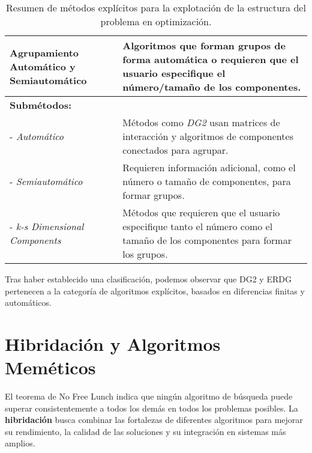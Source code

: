 \begin{table}[H]
{\begin{tabular}{|l|p{12cm}|}
\textbf{Agrupamiento Automático y Semiautomático} & Algoritmos que forman grupos de forma automática o requieren que el usuario especifique el número/tamaño de los componentes. \\ \hline
\multicolumn{2}{|l|}{\textbf{Submétodos:}} \\ \hline
- \textit{Automático} & Métodos como \textit{DG2} usan matrices de interacción y algoritmos de componentes conectados para agrupar. \\ \hline
- \textit{Semiautomático} & Requieren información adicional, como el número o tamaño de componentes, para formar grupos. \\ \hline
- \textit{k-s Dimensional Components} & Métodos que requieren que el usuario especifique tanto el número como el tamaño de los componentes para formar los grupos. \\ \hline
\end{tabular}%
}
\caption{Resumen de métodos explícitos para la explotación de la estructura del problema en optimización.}
\label{tab:explicit_methods}
\end{table}

Tras haber establecido una clasificación, podemos observar que DG2 y ERDG pertenecen a la categoría de algoritmos explícitos, basados en diferencias finitas y automáticos.

\section{Hibridación y Algoritmos Meméticos}

El teorema de No Free Lunch \cite{no_free_lunch} indica que ningún algoritmo de búsqueda puede superar consistentemente a todos los demás en todos los problemas posibles. La \textbf{hibridación} busca combinar las fortalezas de diferentes algoritmos para mejorar su rendimiento, la calidad de las soluciones y su integración en sistemas más amplios.

